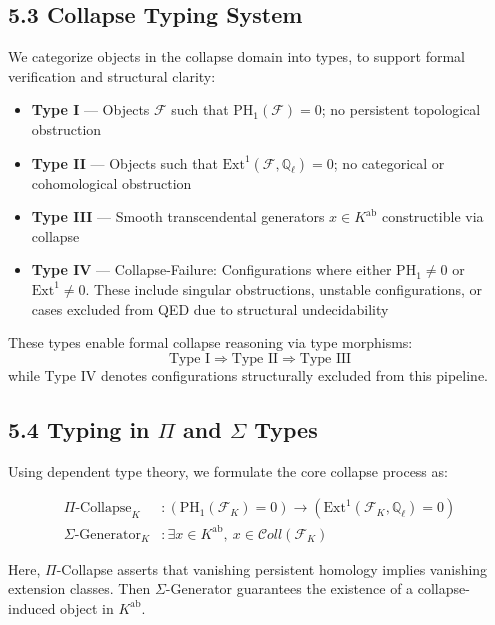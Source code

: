 \documentclass[11pt]{article}
\begin{document}
\subsection{5.3 Collapse Typing System}

We categorize objects in the collapse domain into types, to support formal verification and structural clarity:

\begin{itemize}
    \item \textbf{Type I} — Objects \( \mathcal{F} \) such that \( \mathrm{PH}_1(\mathcal{F}) = 0 \); no persistent topological obstruction
    \item \textbf{Type II} — Objects such that \( \mathrm{Ext}^1(\mathcal{F}, \mathbb{Q}_\ell) = 0 \); no categorical or cohomological obstruction
    \item \textbf{Type III} — Smooth transcendental generators \( x \in K^{\mathrm{ab}} \) constructible via collapse
    \item \textbf{Type IV} — Collapse-Failure: Configurations where either \( \mathrm{PH}_1 \neq 0 \) or \( \mathrm{Ext}^1 \neq 0 \). These include singular obstructions, unstable configurations, or cases excluded from QED due to structural undecidability
\end{itemize}

These types enable formal collapse reasoning via type morphisms:
\[
\text{Type I} \Rightarrow \text{Type II} \Rightarrow \text{Type III}
\]
while Type IV denotes configurations structurally excluded from this pipeline.


\subsection{5.4 Typing in $\Pi$ and $\Sigma$ Types}


Using dependent type theory, we formulate the core collapse process as:

\begin{align*}
\Pi\text{-Collapse}_{K} &\colon \left(\mathrm{PH}_1(\mathcal{F}_K) = 0\right) \rightarrow \left(\mathrm{Ext}^1(\mathcal{F}_K, \mathbb{Q}_\ell) = 0\right) \\
\Sigma\text{-Generator}_{K} &\colon \exists x \in K^{\mathrm{ab}},\ x \in \mathcal{C}oll(\mathcal{F}_K)
\end{align*}

Here, \( \Pi \)-Collapse asserts that vanishing persistent homology implies vanishing extension classes.  
Then \( \Sigma \)-Generator guarantees the existence of a collapse-induced object in \( K^{\mathrm{ab}} \).
\end{document}
